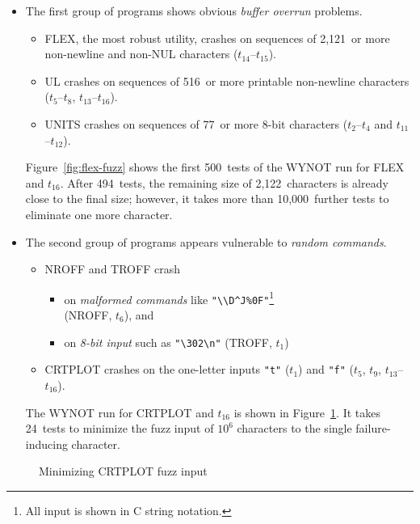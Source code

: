 \documentclass{acm_proc_article-sp}
\newcommand{\COL}        {{\small COL}\xspace}
\newcommand{\CRTPLOT}    {{\small CRTPLOT}\xspace}
\newcommand{\FLEX}       {{\small FLEX}\xspace}
\newcommand{\NROFF}      {{\small NROFF}\xspace}
\newcommand{\TROFF}      {{\small TROFF}\xspace}
\newcommand{\UL}         {{\small UL}\xspace}
\newcommand{\UNITS}      {{\small UNITS}\xspace}
\newcommand{\WYNOT}      {{\small WYNOT}\xspace}
\theoremstyle{plain}
\let\oldfootnote=\footnote
\renewcommand{\footnote}[1]{\oldfootnote{\let\small=\scriptsize #1}}
\begin{document}
\begin{itemize}
\item The first group of programs shows obvious \emph{buffer
  overrun} problems.

\begin{itemize}
\item \FLEX, the most robust utility, crashes on sequences of
  2,121~or more non-newline and non-NUL characters ($t_{14}$--$t_{15}$).
\item \UL crashes on sequences of 516~or more printable non-newline
  characters ($t_5$--$t_8$, $t_{13}$--$t_{16}$).
\item \UNITS crashes on sequences of 77~or more 8-bit characters
  ($t_2$--$t_4$ and $t_{11}$--$t_{12}$).
\end{itemize}
Figure~\ref{fig:flex-fuzz} shows the first 500~tests of the \WYNOT run
for \FLEX and $t_{16}$.  After 494~tests, the remaining size of
2,122~characters is already close to the final size; however, it takes
more than 10,000~further tests to eliminate one more character.

\item The second group of programs appears
  vulnerable to \emph{random commands}.
\begin{itemize}
\item \NROFF and \TROFF crash 
  \begin{itemize}
    \item
      on \emph{malformed commands}
      like \verb:"\\D^J%0F":\footnote{All input is shown in C string notation.}
      \\ (\NROFF, $t_6$), and
    \item
      on \emph{8-bit input} such as \verb:"\302\n": (\TROFF, $t_1$)
    \end{itemize}
\item \CRTPLOT crashes on the one-letter inputs \verb:"t": ($t_1$) and
  \verb:"f": ($t_5$, $t_9$, $t_{13}$--$t_{16}$).
\end{itemize}
The \WYNOT run for \CRTPLOT and $t_{16}$ is shown in
Figure~\ref{fig:crtplot-fuzz}.  It takes 24~tests to minimize the fuzz 
input of $10^6$ characters to the single failure-inducing character.
\end{itemize}


\begin{figure}[t]
\vspace{-1.1cm}
\vspace{-0.5cm}
\caption{Minimizing \CRTPLOT fuzz input}
\label{fig:crtplot-fuzz}
\end{figure}
\end{document}
